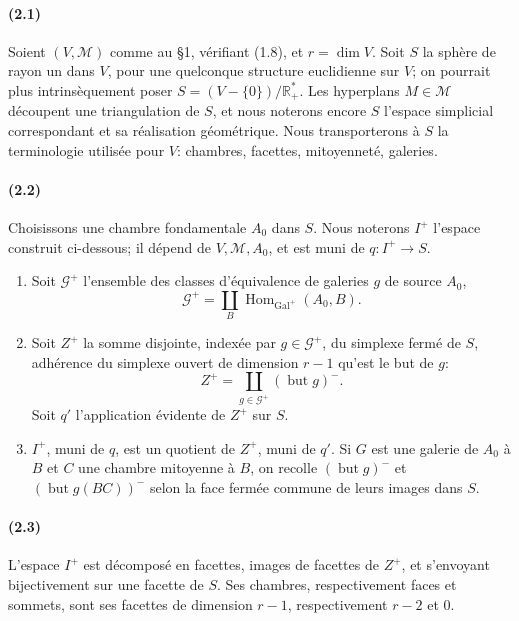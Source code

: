 \documentclass[10pt]{article}
\newcommand{\R}{\mathbb R}
\begin{document}
\paragraph{(2.1)} Soient \((V,\mathcal M)\) comme au §1, vérifiant (1.8), et \(r=\dim V\). Soit \(S\) la sphère de rayon un dans \(V\), pour une quelconque structure euclidienne sur \(V\); on pourrait plus intrinsèquement poser \(S=(V-\{0\})/\R^*_+\). Les hyperplans \(M\in\mathcal M\) découpent une triangulation de \(S\), et nous noterons encore \(S\) l'espace simplicial correspondant et sa réalisation géométrique. Nous transporterons à \(S\) la terminologie utilisée pour \(V\): chambres, facettes, mitoyenneté, galeries.

\paragraph{(2.2)} Choisissons une chambre fondamentale \(A_0\) dans \(S\). Nous noterons \(I^+\) l'espace construit ci-dessous; il dépend de \(V,\mathcal M,A_0\), et est muni de \(q:I^+\to S\).
\begin{enumerate}[label=\alph*)]
\item Soit \(\mathcal G^+\) l'ensemble des classes d'équivalence de galeries \(g\) de source \(A_0\),
\[
\mathcal G^+=\coprod_B\operatorname{Hom}_{\operatorname{Gal}^+}(A_0,B).
\]
\item Soit \(Z^+\) la somme disjointe, indexée par \(g\in\mathcal G^+\), du simplexe fermé de \(S\), adhérence du simplexe ouvert de dimension \(r-1\) qu'est le but de \(g\):
\[
Z^+=\coprod_{g\in\mathcal G^+}(\operatorname{but}g)^{-}.
\]
Soit \(q'\) l'application évidente de \(Z^+\) sur \(S\).
\item \(I^+\), muni de \(q\), est un quotient de \(Z^+\), muni de \(q'\). Si \(G\) est une galerie de \(A_0\) à \(B\) et \(C\) une chambre mitoyenne à \(B\), on recolle \((\operatorname{but}g)^{-}\) et \((\operatorname{but}g(BC))^{-}\) selon la face fermée commune de leurs images dans \(S\).
\end{enumerate}

\paragraph{(2.3)} L'espace \(I^+\) est décomposé en facettes, images de facettes de \(Z^+\), et s'envoyant bijectivement sur une facette de \(S\). Ses chambres, respectivement faces et sommets, sont ses facettes de dimension \(r-1\), respectivement \(r-2\) et \(0\).
\end{document}
